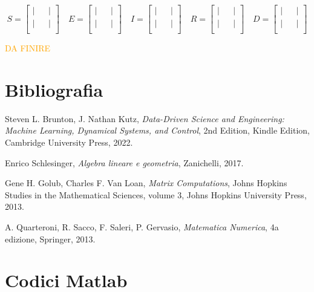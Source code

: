 \documentclass[11pt]{article}
\begin{document}
\[
S=\begin{bmatrix} 
| & & | \\
| & & | \\
\end{bmatrix} \quad
E=\begin{bmatrix} 
| & & | \\
| & & | \\
\end{bmatrix} \quad
I=\begin{bmatrix} 
| & & | \\
| & & | \\
\end{bmatrix} \quad
R=\begin{bmatrix} 
| & & | \\
| & & | \\
\end{bmatrix} \quad
D=\begin{bmatrix} 
| & & | \\
| & & | \\
\end{bmatrix}
\]

\textcolor{orange}{DA FINIRE}


\newpage
\section{Bibliografia}
\begin{thebibliography}{99}

Steven L. Brunton, J. Nathan Kutz, 
\textit{Data-Driven Science and Engineering: Machine Learning, Dynamical Systems, and Control}, 
2nd Edition, Kindle Edition, Cambridge University Press, 2022.

Enrico Schlesinger, 
\textit{Algebra lineare e geometria}, 
Zanichelli, 2017.

Gene H. Golub, Charles F. Van Loan,
\textit{Matrix Computations},
Johns Hopkins Studies in the Mathematical Sciences, volume 3,
Johns Hopkins University Press, 2013. 

 A. Quarteroni, R. Sacco, F. Saleri, P. Gervasio, \textit{Matematica Numerica}, 4a edizione, Springer, 2013. 

\end{thebibliography}

\newpage
\appendix

\section{Codici Matlab}
\end{document}
